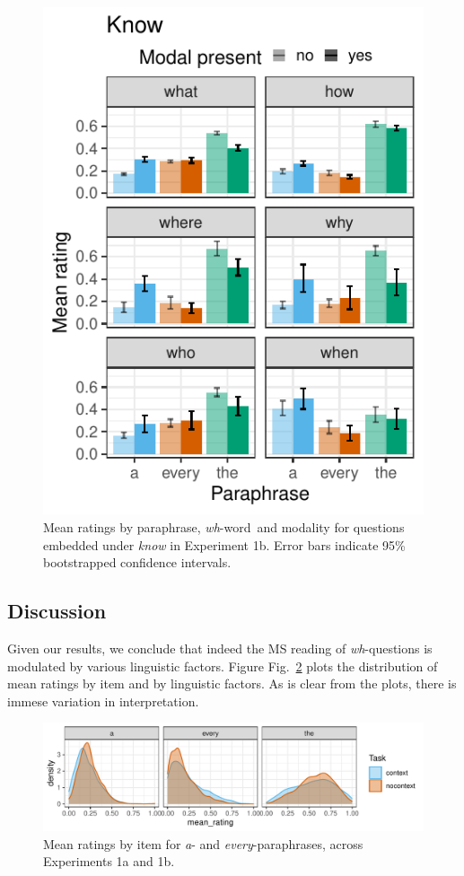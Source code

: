 \documentclass[12pt,letterpaper,table,svgnames,dvipsnames]{article}
\newcommand{\figref}[1]{Fig.~\ref{#1}}
\newcommand{\whw}{\emph{wh}-word~}
\begin{document}
\begin{figure}[h!]
\centering
\includegraphics[scale=1]{figures/modwh_know_context.pdf}
\caption{Mean ratings by paraphrase, \whw and modality for questions embedded under \emph{know} in Experiment 1b. Error bars indicate 95\% bootstrapped confidence intervals.} 
\label{ex1b_modXwh_know}
\end{figure}

\subsection{Discussion}

Given our results, we conclude that indeed the MS reading of \emph{wh}-questions is modulated by various linguistic factors. Figure \figref{exs1_density} plots the distribution of mean ratings by item and by linguistic factors. As is clear from the plots, there is immese variation in interpretation.

\begin{figure}[h!]
\centering
\includegraphics[scale=1]{figures/denisty_context_ratings.pdf}
\caption{Mean ratings by item for \emph{a}- and \emph{every}-paraphrases, across Experiments 1a and 1b.} 
\label{exs1_density}
\end{figure}
\end{document}
